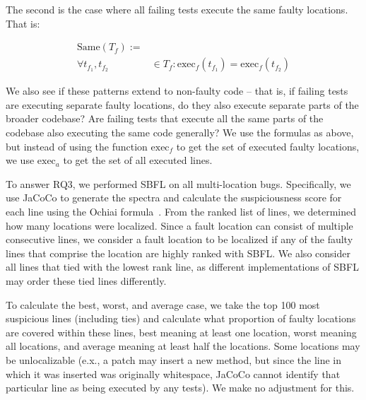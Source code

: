 \documentclass[10pt,journal,compsoc]{IEEEtran}
\begin{document}
The second is the case where all failing tests execute the same faulty locations. That is:

\begin{equation}
\begin{aligned}
    \text{Same}(T_f) :=& \\
    \forall{t_{f_1}, t_{f_2}} &\in T_f : \text{exec}_f(t_{f_1}) = \text{exec}_f(t_{f_2})
    \end{aligned}
\end{equation}

We also see if these patterns extend to non-faulty code -- that is, if failing tests are executing 
separate faulty locations, do they also execute separate parts of the broader codebase?
Are failing tests that execute all the same parts of the codebase also executing the same code generally?
We use the formulas as above, but instead of using the function $\text{exec}_f$ to get the set of executed faulty locations,
we use $\text{exec}_a$ to get the set of all executed lines.

To answer RQ3, we performed SBFL on all multi-location bugs. Specifically, we use JaCoCo to generate the spectra
and calculate the suspiciousness score for each line using the Ochiai formula~\cite{ochiai}.
From the ranked list of lines, we determined how many locations were localized.
Since a fault location can consist of multiple consecutive lines, we consider a 
fault location to be localized if any of the faulty lines that comprise the location are highly ranked with SBFL.
We also consider all lines that tied with the lowest rank line, as different implementations of SBFL may 
order these tied lines differently.

To calculate the best, worst, and average case, we take the top 100 most suspicious lines (including ties)
and calculate what proportion of faulty locations are covered within these lines, best meaning at least one location,
worst meaning all locations, and average meaning at least half the locations. Some locations may be unlocalizable
(e.x., a patch may insert a new method, but since the line in which it was inserted was originally whitespace, JaCoCo cannot 
identify that particular line as being executed by any tests). We make no adjustment for this.
\end{document}
